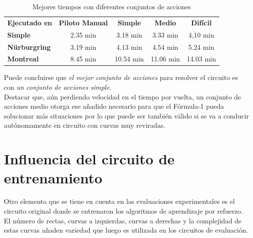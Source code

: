 \begin{table}[ht!]
\centering
\begin{tabular}{|l|c|c|c|c|}
\hline
\rowcolor[HTML]{EFEFEF} 
\multicolumn{5}{|c|}{\cellcolor[HTML]{EFEFEF}\textbf{Mejor tiempo / Acciones}}                                              \\ \hline
\rowcolor[HTML]{EFEFEF} 
\textbf{Ejecutado en}                        & \textbf{Piloto Manual} & \textbf{Simple} & \textbf{Medio} & \textbf{Difícil} \\ \hline
\cellcolor[HTML]{EFEFEF}\textbf{Simple}      & 2.35 min               & 3.18 min        & 3.33 min       & 4,10 min         \\ \hline
\cellcolor[HTML]{EFEFEF}\textbf{Nürburgring} & 3.19 min               & 4.13 min        & 4.54 min       & 5.24 min         \\ \hline
\cellcolor[HTML]{EFEFEF}\textbf{Montreal}    & 8.45 min               & 10.54 min       & 11.06 min      & 14.03 min        \\ \hline
\end{tabular}
\caption{Mejores tiempos con diferentes conjuntos de acciones}
\label{tab:tiempos_acciones}
\end{table}

Puede concluirse que \textit{el mejor conjunto de acciones} para resolver el circuito es con \textit{un conjunto de acciones simple}.\\

Destacar que, aún perdiendo velocidad en el tiempo por vuelta, un conjunto de acciones medio otorga ese añadido necesario para que el Fórmula-1 pueda solucionar más situaciones por lo que puede ser también válido si se va a conducir autónomamente en circuito con curvas muy reviradas.\\


\section{Influencia del circuito de entrenamiento}

Otro elemento que se tiene en cuenta en las evaluaciones experimentales es el circuito original donde se entrenaron los algoritmos de aprendizaje por refuerzo. El número de rectas, curvas a izquierdas, curvas a derechas y la complejidad de estas curvas añaden variedad que luego es utilizada en los circuitos de evaluación.\\

